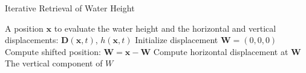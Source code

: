 \begin{algorithm}
\caption{Iterative Retrieval of Water Height}
\label{alg:compute_water_height}
\begin{algorithmic}[1]
\Require A position $\mathbf x$ to evaluate the water height and the horizontal and vertical displacements: $\mathbf{D}(\mathbf x,t)$, $h(\mathbf x,t)$
\State Initialize displacement $\mathbf{W} = (0,0,0)$
 
    \State Compute shifted position: $\mathbf{W} = \mathbf{x} - \mathbf{W}$
    \State Compute horizontal displacement at $\mathbf{W}$ 
\EndFor
\State \Return The vertical component of $W$
\end{algorithmic}
\end{algorithm}
